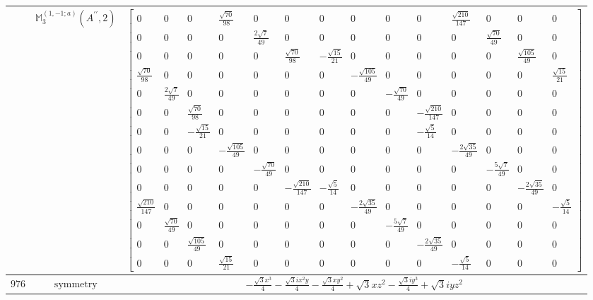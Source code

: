\documentclass[fleqn,8pt,landscape]{jsarticle}
\begin{document}
\begin{longtable}{ccc}
$  $ & $ \mathbb{M}_{3}^{(1,-1;a)}(A^{\prime\prime},2) $ & $ \begin{bmatrix} 0 & 0 & 0 & \frac{\sqrt{70}}{98} & 0 & 0 & 0 & 0 & 0 & 0 & \frac{\sqrt{210}}{147} & 0 & 0 & 0 \\ 0 & 0 & 0 & 0 & \frac{2 \sqrt{7}}{49} & 0 & 0 & 0 & 0 & 0 & 0 & \frac{\sqrt{70}}{49} & 0 & 0 \\ 0 & 0 & 0 & 0 & 0 & \frac{\sqrt{70}}{98} & - \frac{\sqrt{15}}{21} & 0 & 0 & 0 & 0 & 0 & \frac{\sqrt{105}}{49} & 0 \\ \frac{\sqrt{70}}{98} & 0 & 0 & 0 & 0 & 0 & 0 & - \frac{\sqrt{105}}{49} & 0 & 0 & 0 & 0 & 0 & \frac{\sqrt{15}}{21} \\ 0 & \frac{2 \sqrt{7}}{49} & 0 & 0 & 0 & 0 & 0 & 0 & - \frac{\sqrt{70}}{49} & 0 & 0 & 0 & 0 & 0 \\ 0 & 0 & \frac{\sqrt{70}}{98} & 0 & 0 & 0 & 0 & 0 & 0 & - \frac{\sqrt{210}}{147} & 0 & 0 & 0 & 0 \\ 0 & 0 & - \frac{\sqrt{15}}{21} & 0 & 0 & 0 & 0 & 0 & 0 & - \frac{\sqrt{5}}{14} & 0 & 0 & 0 & 0 \\ 0 & 0 & 0 & - \frac{\sqrt{105}}{49} & 0 & 0 & 0 & 0 & 0 & 0 & - \frac{2 \sqrt{35}}{49} & 0 & 0 & 0 \\ 0 & 0 & 0 & 0 & - \frac{\sqrt{70}}{49} & 0 & 0 & 0 & 0 & 0 & 0 & - \frac{5 \sqrt{7}}{49} & 0 & 0 \\ 0 & 0 & 0 & 0 & 0 & - \frac{\sqrt{210}}{147} & - \frac{\sqrt{5}}{14} & 0 & 0 & 0 & 0 & 0 & - \frac{2 \sqrt{35}}{49} & 0 \\ \frac{\sqrt{210}}{147} & 0 & 0 & 0 & 0 & 0 & 0 & - \frac{2 \sqrt{35}}{49} & 0 & 0 & 0 & 0 & 0 & - \frac{\sqrt{5}}{14} \\ 0 & \frac{\sqrt{70}}{49} & 0 & 0 & 0 & 0 & 0 & 0 & - \frac{5 \sqrt{7}}{49} & 0 & 0 & 0 & 0 & 0 \\ 0 & 0 & \frac{\sqrt{105}}{49} & 0 & 0 & 0 & 0 & 0 & 0 & - \frac{2 \sqrt{35}}{49} & 0 & 0 & 0 & 0 \\ 0 & 0 & 0 & \frac{\sqrt{15}}{21} & 0 & 0 & 0 & 0 & 0 & 0 & - \frac{\sqrt{5}}{14} & 0 & 0 & 0 \end{bmatrix} $ \\ \hline
$ 976 $ & $ \text{symmetry} $ & $ - \frac{\sqrt{3} x^{3}}{4} - \frac{\sqrt{3} i x^{2} y}{4} - \frac{\sqrt{3} x y^{2}}{4} + \sqrt{3} x z^{2} - \frac{\sqrt{3} i y^{3}}{4} + \sqrt{3} i y z^{2} $ \\

\end{longtable}
\end{document}
